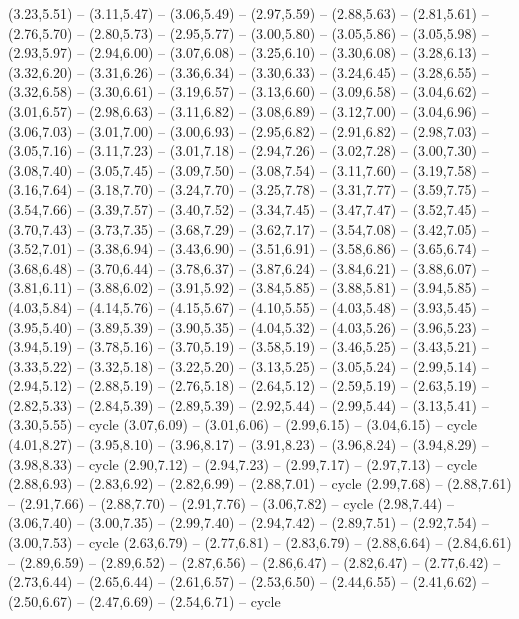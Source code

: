\expandafter\def\csname geo:gebiet:VAT\endcsname{
  }
\expandafter\def\csname geo:gebiet:JEY\endcsname{
  }
\expandafter\def\csname geo:gebiet:GGY\endcsname{
  }
\expandafter\def\csname geo:gebiet:IMN\endcsname{
  }
\expandafter\def\csname geo:gebiet:GBR\endcsname{
  (3.23,5.51) -- (3.11,5.47) -- (3.06,5.49) -- (2.97,5.59) -- (2.88,5.63) -- (2.81,5.61) -- (2.76,5.70) -- (2.80,5.73) -- (2.95,5.77) -- (3.00,5.80) -- (3.05,5.86) -- (3.05,5.98) -- (2.93,5.97) -- (2.94,6.00) -- (3.07,6.08) -- (3.25,6.10) -- (3.30,6.08) -- (3.28,6.13) -- (3.32,6.20) -- (3.31,6.26) -- (3.36,6.34) -- (3.30,6.33) -- (3.24,6.45) -- (3.28,6.55) -- (3.32,6.58) -- (3.30,6.61) -- (3.19,6.57) -- (3.13,6.60) -- (3.09,6.58) -- (3.04,6.62) -- (3.01,6.57) -- (2.98,6.63) -- (3.11,6.82) -- (3.08,6.89) -- (3.12,7.00) -- (3.04,6.96) -- (3.06,7.03) -- (3.01,7.00) -- (3.00,6.93) -- (2.95,6.82) -- (2.91,6.82) -- (2.98,7.03) -- (3.05,7.16) -- (3.11,7.23) -- (3.01,7.18) -- (2.94,7.26) -- (3.02,7.28) -- (3.00,7.30) -- (3.08,7.40) -- (3.05,7.45) -- (3.09,7.50) -- (3.08,7.54) -- (3.11,7.60) -- (3.19,7.58) -- (3.16,7.64) -- (3.18,7.70) -- (3.24,7.70) -- (3.25,7.78) -- (3.31,7.77) -- (3.59,7.75) -- (3.54,7.66) -- (3.39,7.57) -- (3.40,7.52) -- (3.34,7.45) -- (3.47,7.47) -- (3.52,7.45) -- (3.70,7.43) -- (3.73,7.35) -- (3.68,7.29) -- (3.62,7.17) -- (3.54,7.08) -- (3.42,7.05) -- (3.52,7.01) -- (3.38,6.94) -- (3.43,6.90) -- (3.51,6.91) -- (3.58,6.86) -- (3.65,6.74) -- (3.68,6.48) -- (3.70,6.44) -- (3.78,6.37) -- (3.87,6.24) -- (3.84,6.21) -- (3.88,6.07) -- (3.81,6.11) -- (3.88,6.02) -- (3.91,5.92) -- (3.84,5.85) -- (3.88,5.81) -- (3.94,5.85) -- (4.03,5.84) -- (4.14,5.76) -- (4.15,5.67) -- (4.10,5.55) -- (4.03,5.48) -- (3.93,5.45) -- (3.95,5.40) -- (3.89,5.39) -- (3.90,5.35) -- (4.04,5.32) -- (4.03,5.26) -- (3.96,5.23) -- (3.94,5.19) -- (3.78,5.16) -- (3.70,5.19) -- (3.58,5.19) -- (3.46,5.25) -- (3.43,5.21) -- (3.33,5.22) -- (3.32,5.18) -- (3.22,5.20) -- (3.13,5.25) -- (3.05,5.24) -- (2.99,5.14) -- (2.94,5.12) -- (2.88,5.19) -- (2.76,5.18) -- (2.64,5.12) -- (2.59,5.19) -- (2.63,5.19) -- (2.82,5.33) -- (2.84,5.39) -- (2.89,5.39) -- (2.92,5.44) -- (2.99,5.44) -- (3.13,5.41) -- (3.30,5.55) -- cycle
  (3.07,6.09) -- (3.01,6.06) -- (2.99,6.15) -- (3.04,6.15) -- cycle
  (4.01,8.27) -- (3.95,8.10) -- (3.96,8.17) -- (3.91,8.23) -- (3.96,8.24) -- (3.94,8.29) -- (3.98,8.33) -- cycle
  (2.90,7.12) -- (2.94,7.23) -- (2.99,7.17) -- (2.97,7.13) -- cycle
  (2.88,6.93) -- (2.83,6.92) -- (2.82,6.99) -- (2.88,7.01) -- cycle
  (2.99,7.68) -- (2.88,7.61) -- (2.91,7.66) -- (2.88,7.70) -- (2.91,7.76) -- (3.06,7.82) -- cycle
  (2.98,7.44) -- (3.06,7.40) -- (3.00,7.35) -- (2.99,7.40) -- (2.94,7.42) -- (2.89,7.51) -- (2.92,7.54) -- (3.00,7.53) -- cycle
  (2.63,6.79) -- (2.77,6.81) -- (2.83,6.79) -- (2.88,6.64) -- (2.84,6.61) -- (2.89,6.59) -- (2.89,6.52) -- (2.87,6.56) -- (2.86,6.47) -- (2.82,6.47) -- (2.77,6.42) -- (2.73,6.44) -- (2.65,6.44) -- (2.61,6.57) -- (2.53,6.50) -- (2.44,6.55) -- (2.41,6.62) -- (2.50,6.67) -- (2.47,6.69) -- (2.54,6.71) -- cycle}
